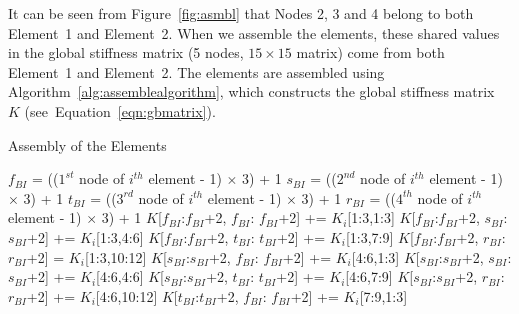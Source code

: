 It can be seen from Figure~\ref{fig:asmbl} that Nodes 2, 3 and 4 belong to both Element~1 and Element~2. When we assemble the elements, these shared values in the global stiffness matrix (5 nodes, $15 \times 15$ matrix) come from both Element~1 and Element~2. The elements are assembled using Algorithm~\ref{alg:assemblealgorithm}, which constructs the global stiffness matrix~$K$ (see~Equation~\ref{eqn:gbmatrix}).

\begin{algorithm}                      %
\caption{Assembly of the Elements}     %
\label{alg:assemblealgorithm}          %
{
\fontsize{10}{10}\selectfont
\begin{algorithmic}[l]
  \vspace*{1.0ex}
     \STATE $f_{BI}$ = (($1^{st}$ node of $i^{th}$ element - 1) $\times$ 3) + 1 \vspace*{1.0ex}
     \STATE $s_{BI}$ = (($2^{nd}$ node of $i^{th}$ element - 1) $\times$ 3) + 1 \vspace*{1.0ex}
     \STATE $t_{BI}$ = (($3^{rd}$ node of $i^{th}$ element - 1) $\times$ 3) + 1 \vspace*{1.0ex}
     \STATE $r_{BI}$ = (($4^{th}$ node of $i^{th}$ element - 1) $\times$ 3) + 1 \vspace*{1.0ex}
     \STATE $K$[$f_{BI}$:$f_{BI}$+2, $f_{BI}$: $f_{BI}$+2] += $K_{i}$[1:3,1:3] \vspace*{1.0ex}
     \STATE $K$[$f_{BI}$:$f_{BI}$+2, $s_{BI}$: $s_{BI}$+2] += $K_{i}$[1:3,4:6] \vspace*{1.0ex}
     \STATE $K$[$f_{BI}$:$f_{BI}$+2, $t_{BI}$: $t_{BI}$+2] += $K_{i}$[1:3,7:9] \vspace*{1.0ex}
     \STATE $K$[$f_{BI}$:$f_{BI}$+2, $r_{BI}$: $r_{BI}$+2] = $K_{i}$[1:3,10:12] \vspace*{1.0ex}
     \STATE $K$[$s_{BI}$:$s_{BI}$+2, $f_{BI}$: $f_{BI}$+2] += $K_{i}$[4:6,1:3] \vspace*{1.0ex}
     \STATE $K$[$s_{BI}$:$s_{BI}$+2, $s_{BI}$: $s_{BI}$+2] += $K_{i}$[4:6,4:6] \vspace*{1.0ex}
     \STATE $K$[$s_{BI}$:$s_{BI}$+2, $t_{BI}$: $t_{BI}$+2] += $K_{i}$[4:6,7:9] \vspace*{1.0ex}
     \STATE $K$[$s_{BI}$:$s_{BI}$+2, $r_{BI}$: $r_{BI}$+2] += $K_{i}$[4:6,10:12] \vspace*{1.0ex}
     \STATE $K$[$t_{BI}$:$t_{BI}$+2, $f_{BI}$: $f_{BI}$+2] += $K_{i}$[7:9,1:3] \vspace*{1.0ex}

\end{algorithmic}}
\end{algorithm}
